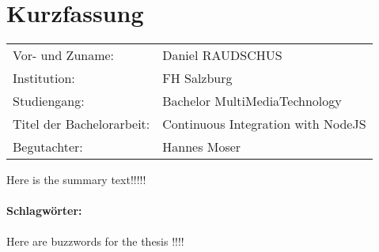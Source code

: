 \section*{Kurzfassung}
\begin{tabular}{l l}
Vor- und Zuname:& Daniel RAUDSCHUS\\
Institution: & FH Salzburg\\
Studiengang: &  Bachelor MultiMediaTechnology\\
Titel der Bachelorarbeit: & Continuous Integration with NodeJS\\
Begutachter: & Hannes Moser\\
\end{tabular}
\vspace{0.5cm}

Here is the summary text!!!!!
\paragraph{Schlagwörter:}
Here are buzzwords for the thesis !!!!
